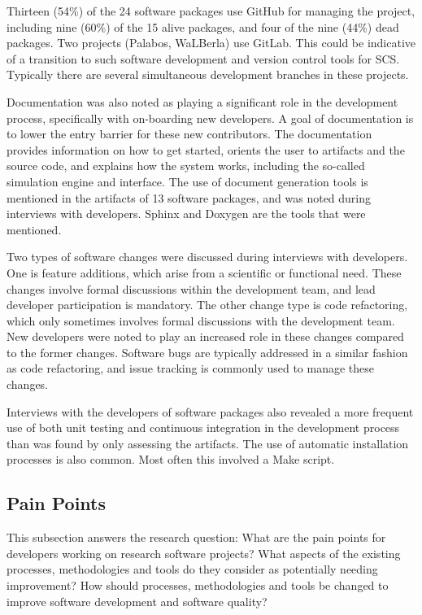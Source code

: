 \documentclass[final, 3p, times, authoryear]{elsarticle}
\begin{document}
Thirteen (54\%) of the 24 software packages use GitHub for managing the project,
including nine (60\%) of the 15 alive packages, and four of the nine (44\%) dead
packages. Two projects (Palabos, WaLBerla) use GitLab. This could be indicative
of a transition to such software development and version control tools for SCS.
Typically there are several simultaneous development branches in these projects.

Documentation was also noted as playing a significant role in the development
process, specifically with on-boarding new developers. A goal of documentation
is to lower the entry barrier for these new contributors. The documentation
provides information on how to get started, orients the user to artifacts and
the source code, and explains how the system works, including the so-called
simulation engine and interface. The use of document generation tools is
mentioned in the artifacts of 13 software packages, and was noted during
interviews with developers. Sphinx and Doxygen are the tools that were
mentioned. 

Two types of software changes were discussed during interviews with developers.
One is feature additions, which arise from a scientific or functional need.
These changes involve formal discussions within the development team, and lead
developer participation is mandatory. The other change type is code refactoring,
which only sometimes involves formal discussions with the development team. New
developers were noted to play an increased role in these changes compared to the
former changes. Software bugs are typically addressed in a similar fashion as
code refactoring, and issue tracking is commonly used to manage these changes. 

Interviews with the developers of software packages also revealed a more
frequent use of both unit testing and continuous integration in the development
process than was found by only assessing the artifacts. The use of automatic
installation processes is also common. Most often this involved a Make script.

\subsection{Pain Points} \label{painpoints}

This subsection answers the research question: What are the pain points for
developers working on research software projects? What aspects of the existing
processes, methodologies and tools do they consider as potentially needing
improvement? How should processes, methodologies and tools be changed to improve
software development and software quality?
\end{document}
